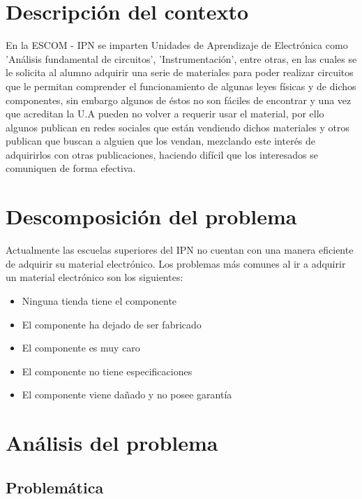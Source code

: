 \section{Descripción del contexto}

En la ESCOM - IPN se imparten Unidades de Aprendizaje de Electrónica como 'Análisis fundamental de circuitos', 'Instrumentación', entre otras, en las cuales se le solicita al alumno adquirir una serie de materiales para poder realizar circuitos que le permitan comprender el funcionamiento de algunas leyes físicas y de dichos componentes, sin embargo algunos de éstos no son fáciles de encontrar y una vez que acreditan la U.A pueden no volver a requerir usar el material, por ello algunos publican en redes sociales que están vendiendo dichos materiales y otros publican que buscan a alguien que los vendan, mezclando este interés de adquirirlos con otras publicaciones, haciendo difícil que los interesados se comuniquen de forma efectiva.
	
\section{Descomposición del problema}

	Actualmente las escuelas superiores del IPN no cuentan con una manera eficiente de adquirir su material electrónico. Los problemas más comunes al ir a adquirir un material electrónico son los siguientes:
	
\begin{itemize}
	\item Ninguna tienda tiene el componente
	\item El componente ha dejado de ser fabricado
	\item El componente es muy caro
	\item El componente no tiene especificaciones
	\item El componente viene dañado y no posee garantía
\end{itemize}

\section{Análisis del problema}
\subsection{Problemática}

